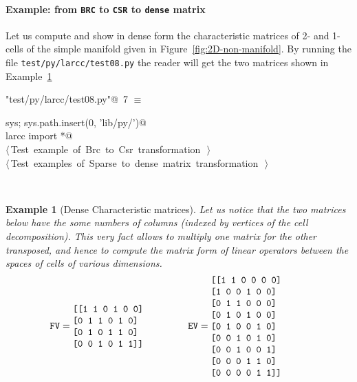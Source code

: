 \documentclass[11pt,oneside]{article}	%
\newtheorem{example}{Example}
\begin{document}
\paragraph{Example: from \texttt{BRC} to \texttt{CSR} to \texttt{dense} matrix} 
Let us compute and show in dense form the characteristic matrices of 2- and 1-cells of the simple manifold given in Figure~\ref{fig:2D-non-manifold}.
By running the file \texttt{test/py/larcc/test08.py} the reader will get the two matrices shown in Example~\ref{ex:denseMat}
\begin{flushleft} \small
\begin{minipage}{\linewidth} \label{scrap13}
\protect{}\verb@"test/py/larcc/test08.py"@\nobreak\ {\footnotesize 7 }$\equiv$
\vspace{-1ex}
\begin{list}{}{} \item
\mbox{}\verb@import sys; sys.path.insert(0, 'lib/py/')@\\
\mbox{}\verb@from larcc import *@\\
\mbox{}\verb@@\hbox{$\langle\,$Test example of Brc to Csr transformation\nobreak\ {\footnotesize {}}$\,\rangle$}\verb@@\\
\mbox{}\verb@@\hbox{$\langle\,$Test examples of Sparse to dense matrix transformation\nobreak\ {\footnotesize {}}$\,\rangle$}\verb@@\\
\mbox{}\verb@@{\NWsep}
\end{list}
\vspace{-2ex}
\end{minipage}\\[4ex]
\end{flushleft}
 
\begin{example}[Dense Characteristic matrices]\label{ex:denseMat}
Let us notice that the two matrices below have the some numbers of columns (indexed by vertices of the cell decomposition).
This very fact allows to multiply one matrix for the other transposed, and hence to compute the matrix form of linear operators between the spaces of cells of various dimensions.
\[
\texttt{FV} =
\begin{minipage}[c]{0.29\linewidth}
\begin{verbatim}
[[1 1 0 1 0 0]
 [0 1 1 0 1 0]
 [0 1 0 1 1 0]
 [0 0 1 0 1 1]]
\end{verbatim}
\end{minipage}
\qquad
\texttt{EV} =
\begin{minipage}[c]{0.29\linewidth}
\begin{verbatim}
[[1 1 0 0 0 0]
 [1 0 0 1 0 0]
 [0 1 1 0 0 0]
 [0 1 0 1 0 0]
 [0 1 0 0 1 0]
 [0 0 1 0 1 0]
 [0 0 1 0 0 1]
 [0 0 0 1 1 0]
 [0 0 0 0 1 1]]
\end{verbatim}
\end{minipage}
\]
\end{example}
\end{document}
